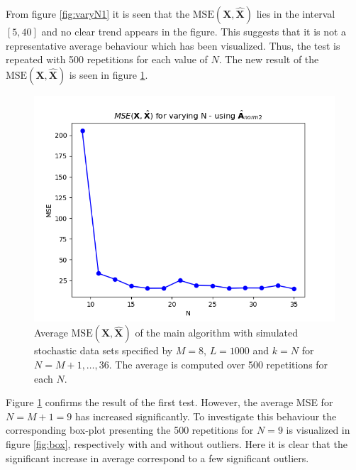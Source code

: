 \noindent
From figure \ref{fig:varyN1} it is seen that the $\text{MSE}(\mathbf{X}, \hat{\mathbf{X}})$ lies in the interval $[5,40]$ and no clear trend appears in the figure. 
This suggests that it is not a representative average behaviour which has been visualized. 
Thus, the test is repeated with 500 repetitions for each value of $N$. 
The new result of the $\text{MSE}(\mathbf{X}, \hat{\mathbf{X}})$ is seen in figure \ref{fig:varyN2}.
\begin{figure}[H]
    \centering
	\includegraphics[scale=0.5]{figures/ch_6/varyN2.png}
	\caption{Average $\text{MSE}(\mathbf{X}, \hat{\mathbf{X}})$ of the main algorithm with simulated stochastic data sets specified by $M = 8$, $L = 1000$ and $k = N$ for $N = M+1, \dots ,36$. The average is computed over 500 repetitions for each $N$.}
	\label{fig:varyN2}
\end{figure}  
\noindent
Figure \ref{fig:varyN2} confirms the result of the first test. 
However, the average MSE for $N = M + 1 = 9$ has increased significantly. 
To investigate this behaviour the corresponding box-plot presenting the 500 repetitions for $N=9$ is visualized in figure \ref{fig:box}, respectively with and without outliers. 
Here it is clear that the significant increase in average correspond to a few significant outliers. 
